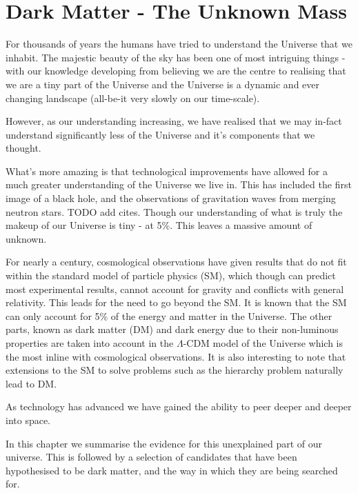 \chapter{Dark Matter - The Unknown Mass}

\par
For thousands of years the humans have tried to understand the Universe that we inhabit.
The majestic beauty of the sky has been one of most intriguing things - with our knowledge developing from believing we are the centre to realising that we are a tiny part of the Universe and the Universe is a dynamic and ever changing landscape (all-be-it very slowly on our time-scale).

\par
However, as our understanding increasing, we have realised that we may in-fact understand significantly less of the Universe and it's components that we thought.

What's more amazing is that technological improvements have allowed for a much greater understanding of the Universe we live in.
This has included the first image of a black hole, and the observations of gravitation waves from merging neutron stars. 
TODO add cites.
Though our understanding of what is truly the makeup of our Universe is tiny - at 5\%. 
This leaves a massive amount of unknown.

For nearly a century, cosmological observations have given results that do not fit within the standard model of particle physics (SM), which though can predict most experimental results, cannot account for gravity and conflicts with general relativity. 
This leads for the need to go beyond the SM. It is known that the SM can only account for 5\% of the energy and matter in the Universe. 
The other parts, known as dark matter (DM) and dark energy due to their non-luminous properties are taken into account in the $\Lambda$-CDM model of the Universe which is the most inline with cosmological observations.
It is also interesting to note that extensions to the SM to solve problems such as the hierarchy problem naturally lead to DM.


\par
As technology has advanced we have gained the ability to peer deeper and deeper into space.

\par
In this chapter we summarise the evidence for this unexplained part of our universe.
This is followed by a selection of candidates that have been hypothesised to be dark matter, and the way in which they are being searched for.




